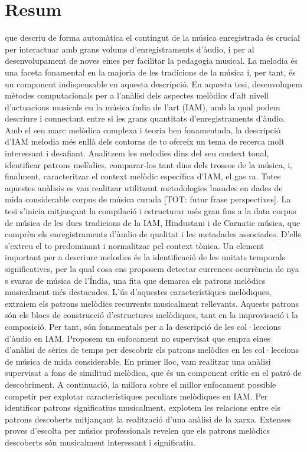 
\chapter{Resum}

que descriu de forma automàtica el contingut de la música enregistrada és crucial per interactuar amb grans volums d'enregistraments d'àudio, i per al desenvolupament de noves eines per facilitar la pedagogia musical. La melodia és una faceta fonamental en la majoria de les tradicions de la música i, per tant, és un component indispensable en aquesta descripció. En aquesta tesi, desenvolupem mètodes computacionals per a l'anàlisi dels aspectes melòdics d'alt nivell d'actuacions musicals en la música índia de l'art (IAM), amb la qual podem descriure i connectant entre si les grans quantitats d'enregistraments d'àudio. Amb el seu marc melòdica complexa i teoria ben fonamentada, la descripció d'IAM melodia més enllà dels contorns de to ofereix un tema de recerca molt interessant i desafiant. Analitzem les melodies dins del seu context tonal, identificar patrons melòdics, comparar-los tant dins dels trossos de la música, i, finalment, caracteritzar el context melòdic específica d'IAM, el gas ra. Totes aquestes anàlisis es van realitzar utilitzant metodologies basades en dades de mida considerable corpus de música curada [TOT: futur frase perspectives].
La tesi s'inicia mitjançant la compilació i estructurar més gran fins a la data corpus de música de les dues tradicions de la IAM, Hindustani i de Carnatic música, que comprèn els enregistraments d'àudio de qualitat i les metadades associades. D'ells s'extreu el to predominant i normalitzar pel context tònica. Un element important per a descriure melodies és la identificació de les unitats temporals significatives, per la qual cosa ens proposem detectar currences ocurrència de nya s svaras de música de l'Índia, una fita que demarca els patrons melòdics musicalment més destacades.
L'ús d'aquestes característiques melòdiques, extraiem els patrons melòdics recurrents musicalment rellevants. Aquests patrons són els blocs de construcció d'estructures melòdiques, tant en la improvisació i la composició. Per tant, són fonamentals per a la descripció de les col·leccions d'àudio en IAM. Proposem un enfocament no supervisat que empra eines d'anàlisi de sèries de temps per descobrir els patrons melòdics en les col·leccions de música de mida considerable. En primer lloc, vam realitzar una anàlisi supervisat a fons de similitud melòdica, que és un component crític en el patró de descobriment. A continuació, la millora sobre el millor enfocament possible competir per explotar característiques peculiars melòdiques en IAM. Per identificar patrons significatius musicalment, explotem les relacions entre els patrons descoberts mitjançant la realització d'una anàlisi de la xarxa. Extenses proves d'escolta per músics professionals revelen que els patrons melòdics descoberts són musicalment interessant i significatiu.

